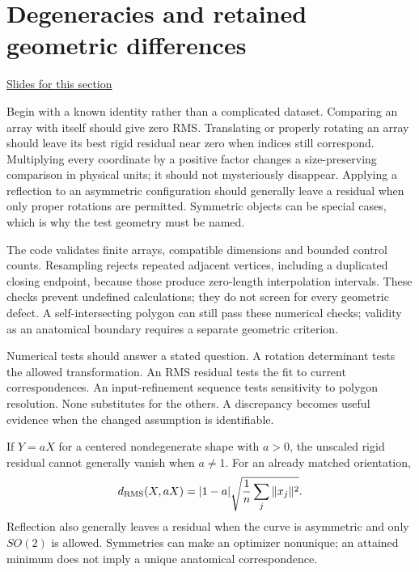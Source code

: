 \documentclass[11pt,letterpaper]{article}
\theoremstyle{definition}\newtheorem{definition}{Definition}\newtheorem{example}{Example}
\numberwithin{equation}{section}
\begin{document}
\section{Degeneracies and retained geometric differences}
\hypertarget{note-degeneracies-and-retained-geometric-differences}{}\label{note:degeneracies-and-retained-geometric-differences}
{\small \href{slides.html\#frame=zero-length-edges-and-zero-spread\&step=1}{Slides for this section}}\par
Begin with a known identity rather than a complicated dataset. Comparing an array with itself should give zero RMS. Translating or properly rotating an array should leave its best rigid residual near zero when indices still correspond. Multiplying every coordinate by a positive factor changes a size-preserving comparison in physical units; it should not mysteriously disappear. Applying a reflection to an asymmetric configuration should generally leave a residual when only proper rotations are permitted. Symmetric objects can be special cases, which is why the test geometry must be named.

The code validates finite arrays, compatible dimensions and bounded control counts. Resampling rejects repeated adjacent vertices, including a duplicated closing endpoint, because those produce zero-length interpolation intervals. These checks prevent undefined calculations; they do not screen for every geometric defect. A self-intersecting polygon can still pass these numerical checks; validity as an anatomical boundary requires a separate geometric criterion.

Numerical tests should answer a stated question. A rotation determinant tests the allowed transformation. An RMS residual tests the fit to current correspondences. An input-refinement sequence tests sensitivity to polygon resolution. None substitutes for the others. A discrepancy becomes useful evidence when the changed assumption is identifiable.

If $Y=aX$ for a centered nondegenerate shape with $a>0$, the unscaled rigid residual cannot generally vanish when $a\ne1$. For an already matched orientation,
\[
 d_{\rm RMS}(X,aX)=|1-a|\sqrt{\frac1n\sum_j\|x_j\|^2}.
\]
Reflection also generally leaves a residual when the curve is asymmetric and only $SO(2)$ is allowed. Symmetries can make an optimizer nonunique; an attained minimum does not imply a unique anatomical correspondence.
\end{document}
